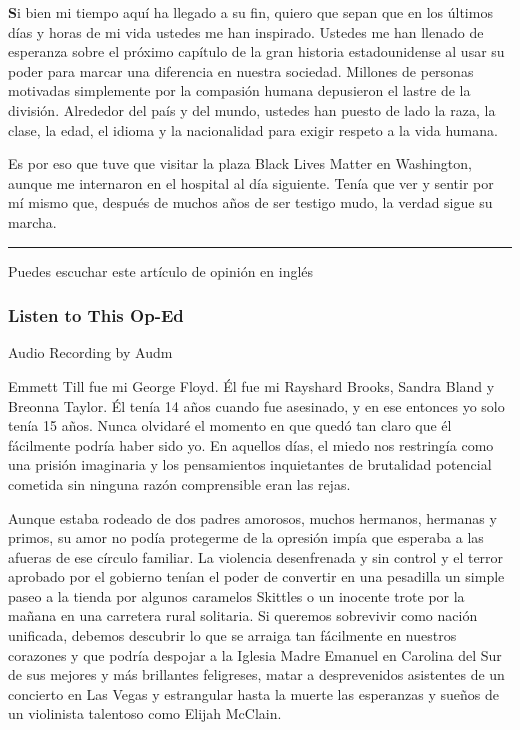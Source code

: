 \textbf{S}i bien mi tiempo aquí ha llegado a su fin, quiero que sepan
que en los últimos días y horas de mi vida ustedes me han inspirado.
Ustedes me han llenado de esperanza sobre el próximo capítulo de la gran
historia estadounidense al usar su poder para marcar una diferencia en
nuestra sociedad. Millones de personas motivadas simplemente por la
compasión humana depusieron el lastre de la división. Alrededor del país
y del mundo, ustedes han puesto de lado la raza, la clase, la edad, el
idioma y la nacionalidad para exigir respeto a la vida humana.

Es por eso que tuve que visitar la plaza Black Lives Matter en
Washington, aunque me internaron en el hospital al día siguiente. Tenía
que ver y sentir por mí mismo que, después de muchos años de ser testigo
mudo, la verdad sigue su marcha.

\begin{center}\rule{0.5\linewidth}{\linethickness}\end{center}

Puedes escuchar este artículo de opinión en inglés

\hypertarget{listen-to-this-op-ed}{%
\subsubsection{Listen to This Op-Ed}\label{listen-to-this-op-ed}}

Audio Recording by Audm

Emmett Till fue mi George Floyd. Él fue mi Rayshard Brooks, Sandra Bland
y Breonna Taylor. Él tenía 14 años cuando fue asesinado, y en ese
entonces yo solo tenía 15 años. Nunca olvidaré el momento en que quedó
tan claro que él fácilmente podría haber sido yo. En aquellos días, el
miedo nos restringía como una prisión imaginaria y los pensamientos
inquietantes de brutalidad potencial cometida sin ninguna razón
comprensible eran las rejas.

Aunque estaba rodeado de dos padres amorosos, muchos hermanos, hermanas
y primos, su amor no podía protegerme de la opresión impía que esperaba
a las afueras de ese círculo familiar. La violencia desenfrenada y sin
control y el terror aprobado por el gobierno tenían el poder de
convertir en una pesadilla un simple paseo a la tienda por algunos
caramelos Skittles o un inocente trote por la mañana en una carretera
rural solitaria. Si queremos sobrevivir como nación unificada, debemos
descubrir lo que se arraiga tan fácilmente en nuestros corazones y que
podría despojar a la Iglesia Madre Emanuel en Carolina del Sur de sus
mejores y más brillantes feligreses, matar a desprevenidos asistentes de
un concierto en Las Vegas y estrangular hasta la muerte las esperanzas y
sueños de un violinista talentoso como Elijah McClain.

